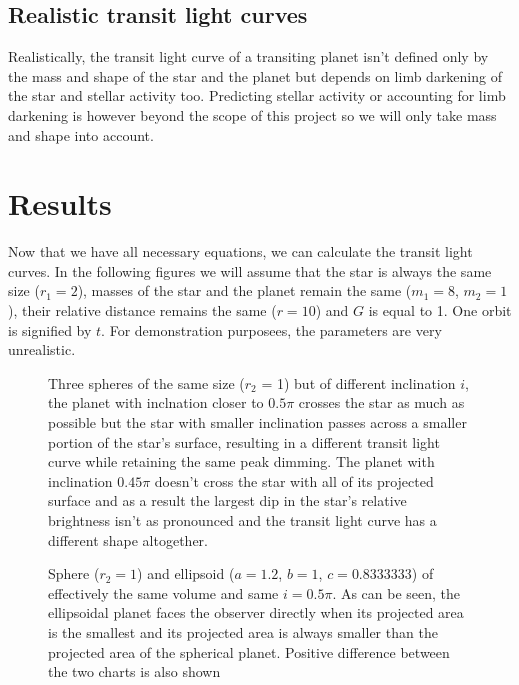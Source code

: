\documentclass[10pt]{article}
\numberwithin{equation}{subsection}
\begin{document}
\subsection{Realistic transit light curves}
Realistically, the transit light curve of a transiting planet isn't defined only by
the mass and shape of the star and the planet but depends on limb darkening of the star
and stellar activity too. Predicting stellar activity or accounting for limb darkening
is however beyond the scope of this project so we will only take mass and shape into
account.
\section{Results}
Now that we have all necessary equations, we can calculate the transit light curves.
In the following figures we will assume that the star is always the same size ($r_1 = 2$),
masses of the star and the planet remain the same ($m_1 = 8$, $m_2 = 1$), their relative
distance remains the same ($r = 10$) and $G$ is equal to 1. One orbit is signified by $t$.
For demonstration purposees, the parameters are very unrealistic.
\begin{figure}[H]
  \centering
  
  \caption{Three spheres of the same size ($r_2$ = 1) but of different inclination $i$,
  the planet with inclnation closer to $0.5\pi$ crosses the star as much as possible
  but the star with smaller inclination passes across a smaller portion of the star's
  surface, resulting in a different transit light curve while retaining the same
  peak dimming. The planet with inclination $0.45 \pi$ doesn't cross the star with all
  of its projected surface and as a result the largest dip in the star's relative
  brightness isn't as pronounced and the transit light curve has a different shape altogether.}
\end{figure}
%   
\begin{figure}[H]
  \centering
  
  \caption{Sphere ($r_2=1$) and ellipsoid ($a=1.2$, $b=1$, $c=0.8333333$) of effectively
  the same volume and same $i=0.5\pi$. As can be seen, the ellipsoidal planet faces the
  observer directly when its projected area is the smallest and its projected area is
  always smaller than the projected area of the spherical planet. Positive difference
  between the two charts is also shown}
\end{figure}
\end{document}

